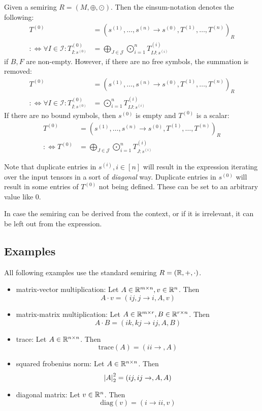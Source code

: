 Given a semiring $R = (M, \oplus, \odot)$. Then the einsum-notation denotes the following:
\begin{align*}
    T^{(0)}                                               & = (s^{(1)},\dots,s^{(n)} \rightarrow s^{(0)}, T^{(1)},\dots,T^{(n)})_R                  \\
    :\iff \forall I \in \mathcal{I}: T^{(0)}_{I: s^{(0)}} & = \bigoplus\limits_{J \in \mathcal{J}} \bigodot\limits_{i = 1}^{n} T^{(i)}_{IJ:s^{(i)}}
\end{align*}
if $B,F$ are non-empty. However, if there are no free symbols, the summation is removed:
\begin{align*}
    T^{(0)}                                               & = (s^{(1)},\dots,s^{(n)} \rightarrow s^{(0)}, T^{(1)},\dots,T^{(n)})_R \\
    :\iff \forall I \in \mathcal{I}: T^{(0)}_{I: s^{(0)}} & = \bigodot\limits_{i = 1}^{n} T^{(i)}_{IJ:s^{(i)}}
\end{align*}
If there are no bound symbols, then $s^{(0)}$ is empty and $T^{(0)}$ is a scalar:
\begin{align*}
    T^{(0)}       & = (s^{(1)},\dots,s^{(n)} \rightarrow s^{(0)}, T^{(1)},\dots,T^{(n)})_R                 \\
    :\iff T^{(0)} & = \bigoplus\limits_{J \in \mathcal{J}} \bigodot\limits_{i = 1}^{n} T^{(i)}_{J:s^{(i)}}
\end{align*}

Note that duplicate entries in $s^{(i)}, i \in [n]$ will result in the expression iterating over the input tensors in a sort of \textit{diagonal} way.
Duplicate entries in $s^{(0)}$ will result in some entries of $T^{(0)}$ not being defined. These can be set to an arbitrary value like 0.

In case the semiring can be derived from the context, or if it is irrelevant, it can be left out from the expression.

\subsection{Examples}

All following examples use the standard semiring $R = (\mathbb{R}, +, \cdot)$.
\begin{itemize}
    \item matrix-vector multiplication: Let $A \in \mathbb{R}^{m \times n}, v \in \mathbb{R}^{n}$. Then
          $$A \cdot v = (ij, j \rightarrow i, A, v)$$
    \item matrix-matrix multiplication: Let $A \in \mathbb{R}^{m \times r}, B \in \mathbb{R}^{r \times n}$. Then
          $$A \cdot B = (ik, kj \rightarrow ij, A, B)$$
    \item trace: Let $A \in \mathbb{R}^{n \times n}$. Then
          $$\text{trace}(A) = (ii \rightarrow, A)$$
    \item squared frobenius norm: Let $A \in \mathbb{R}^{n \times n}$. Then
          $$\left| A \right|_2^2 = (ij, ij \rightarrow,A,A)$$
    \item diagonal matrix: Let $v \in \mathbb{R}^{n}$. Then
          $$\text{diag}(v) = (i \rightarrow ii, v)$$
\end{itemize}

